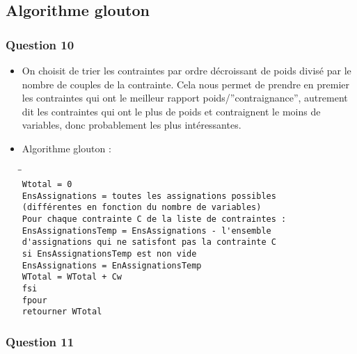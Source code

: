 \documentclass{report}
\begin{document}
\subsection*{Algorithme glouton}

\subsubsection*{Question 10}

\begin{itemize}
\item On choisit de trier les contraintes par ordre décroissant de poids divisé par le nombre de couples de la contrainte. Cela nous permet de prendre en premier les contraintes qui ont le meilleur rapport poids/''contraignance'', autrement dit les contraintes qui ont le plus de poids et contraignent le moins de variables, donc probablement les plus intéressantes.
\item Algorithme glouton :
  \begin{tabbing}
    \hspace{0.3cm}\=\hspace{0.3cm}\=\hspace{3cm}\=\\
    \verb|Wtotal = 0|\\
    \verb|EnsAssignations = toutes les assignations possibles|\\
    \>\>\>\verb|(différentes en fonction du nombre de variables)|\\
    \verb|Pour chaque contrainte C de la liste de contraintes :|\\
    \>\verb|EnsAssignationsTemp = EnsAssignations - l'ensemble|\\
    \>\>\>\verb|d'assignations qui ne satisfont pas la contrainte C|\\
    \>\verb|si EnsAssignationsTemp est non vide|\\
    \>\>\verb|EnsAssignations = EnAssignationsTemp|\\
    \>\>\verb|WTotal = WTotal + Cw|\\
    \>\verb|fsi|\\
    \verb|fpour|\\
    \verb|retourner WTotal|\\
  \end{tabbing}
\end{itemize}

\subsubsection*{Question 11}
\end{document}
